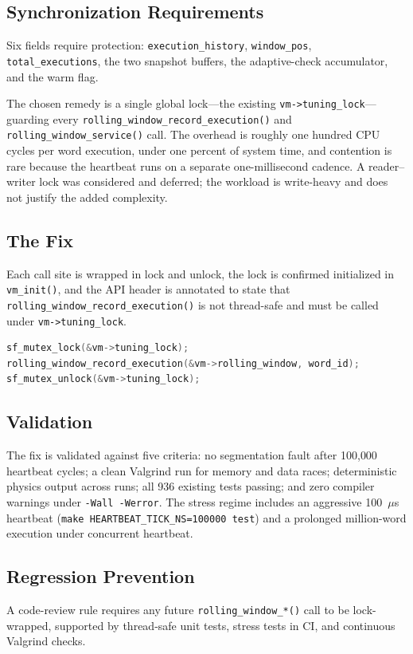\subsection{Synchronization Requirements}

Six fields require protection: \lstinline{execution_history},
\lstinline{window_pos}, \lstinline{total_executions}, the two snapshot buffers,
the adaptive-check accumulator, and the warm flag.

The chosen remedy is a single global lock---the existing
\lstinline{vm->tuning_lock}---guarding every
\lstinline{rolling_window_record_execution()} and
\lstinline{rolling_window_service()} call. The overhead is roughly one hundred
CPU cycles per word execution, under one percent of system time, and contention
is rare because the heartbeat runs on a separate one-millisecond cadence. A
reader--writer lock was considered and deferred; the workload is write-heavy
and does not justify the added complexity.

\subsection{The Fix}

Each call site is wrapped in lock and unlock, the lock is confirmed initialized
in \lstinline{vm_init()}, and the API header is annotated to state that
\lstinline{rolling_window_record_execution()} is not thread-safe and must be
called under \lstinline{vm->tuning_lock}.

\begin{lstlisting}[language=C]
sf_mutex_lock(&vm->tuning_lock);
rolling_window_record_execution(&vm->rolling_window, word_id);
sf_mutex_unlock(&vm->tuning_lock);
\end{lstlisting}

\subsection{Validation}

The fix is validated against five criteria: no segmentation fault after 100{,}000
heartbeat cycles; a clean Valgrind run for memory and data races; deterministic
physics output across runs; all 936 existing tests passing; and zero compiler
warnings under \lstinline{-Wall -Werror}. The stress regime includes an
aggressive 100~$\mu$s heartbeat
(\lstinline{make HEARTBEAT_TICK_NS=100000 test}) and a prolonged
million-word execution under concurrent heartbeat.

\subsection{Regression Prevention}

A code-review rule requires any future \lstinline{rolling_window_*()} call to be
lock-wrapped, supported by thread-safe unit tests, stress tests in CI, and
continuous Valgrind checks.


